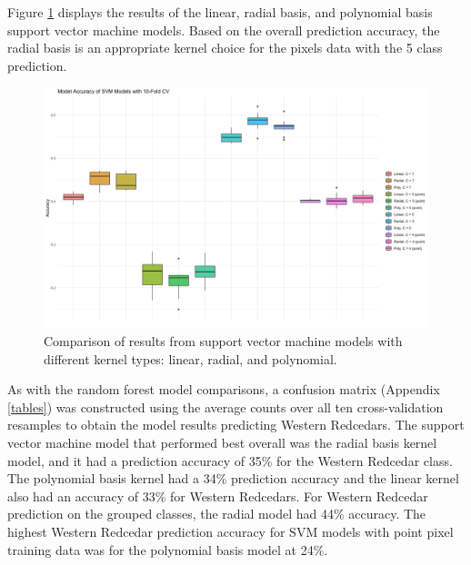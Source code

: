 \documentclass[12pt,twoside]{reedthesis}
\begin{document}
Figure \ref{fig:svmresults} displays the results of the linear, radial basis, and polynomial basis support vector machine models. Based on the overall prediction accuracy, the radial basis is an appropriate kernel choice for the pixels data with the 5 class prediction.
\begin{figure}

{\centering \includegraphics[width=0.9\linewidth]{figure/svmresults} 

}

\caption{Comparison of results from support vector machine models with different kernel types: linear, radial, and polynomial.}\label{fig:svmresults}
\end{figure}
As with the random forest model comparisons, a confusion matrix (Appendix \ref{tables}) was constructed using the average counts over all ten cross-validation resamples to obtain the model results predicting Western Redcedars. The support vector machine model that performed best overall was the radial basis kernel model, and it had a prediction accuracy of 35\% for the Western Redcedar class. The polynomial basis kernel had a 34\% prediction accuracy and the linear kernel also had an accuracy of 33\% for Western Redcedars. For Western Redcedar prediction on the grouped classes, the radial model had 44\% accuracy. The highest Western Redcedar prediction accuracy for SVM models with point pixel training data was for the polynomial basis model at 24\%.
\end{document}
